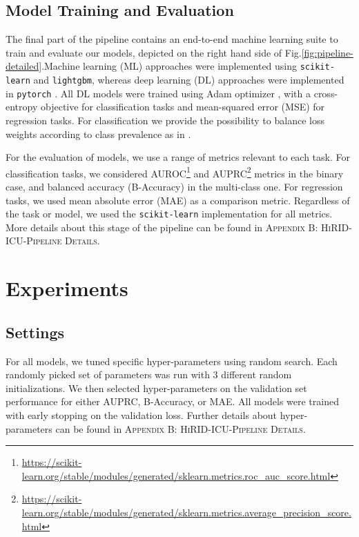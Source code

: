 \documentclass{article}
\begin{document}
\subsection{Model Training and Evaluation}
The final part of the pipeline contains an end-to-end machine learning suite to train and evaluate our models, depicted on the right hand side of Fig.\ref{fig:pipeline-detailed}.Machine learning (ML) approaches were implemented using \texttt{scikit-learn}\cite{scikit-learn} and \texttt{lightgbm}\cite{ke2017lightgbm}, whereas deep learning (DL) approaches were implemented in \texttt{pytorch} \cite{paszke2019pytorch}. All DL models were trained using Adam optimizer \cite{kingma2014adam}, with a cross-entropy objective for classification tasks and mean-squared error (MSE) for regression tasks. For classification we provide the possibility to balance loss weights according to class prevalence as in \cite{king2001logistic}.

For the evaluation of models, we use a range of metrics relevant to each task. For classification tasks, we considered AUROC\footnote{\url{https://scikit-learn.org/stable/modules/generated/sklearn.metrics.roc\_auc\_score.html}} and AUPRC\footnote{\url{https://scikit-learn.org/stable/modules/generated/sklearn.metrics.average\_precision\_score.html}} metrics in the binary case, and balanced accuracy (B-Accuracy) \cite{brodersen2010balanced} in the multi-class one. For regression tasks, we used mean absolute error (MAE) as a comparison metric. Regardless of the task or model, we used the \texttt{scikit-learn} implementation for all metrics. More details about this stage of the pipeline can be found in \textsc{Appendix B: HiRID-ICU-Pipeline Details}.





   \section{Experiments}\label{exp}

\subsection{Settings}

For all models, we tuned specific hyper-parameters using random search. Each randomly picked set of parameters was run with 3 different random initializations. We then selected hyper-parameters on the validation set performance for either AUPRC, B-Accuracy, or MAE. All models were trained with early stopping on the validation loss. Further details about hyper-parameters can be found in \textsc{Appendix B: HiRID-ICU-Pipeline Details}.
\end{document}
